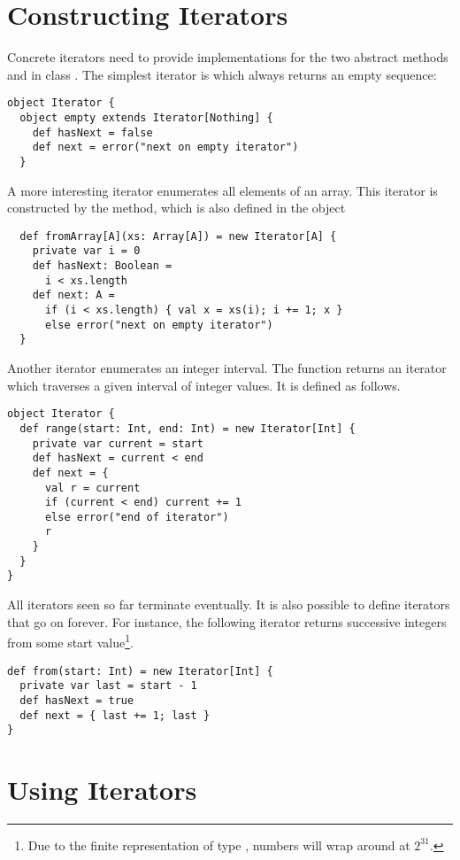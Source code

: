 {\section{Constructing Iterators}

Concrete iterators need to provide implementations for the two
abstract methods  and  in class
. The simplest iterator is  which
always returns an empty sequence:
\begin{lstlisting}
object Iterator {
  object empty extends Iterator[Nothing] {
    def hasNext = false
    def next = error("next on empty iterator")
  }
\end{lstlisting}
A more interesting iterator enumerates all elements of an array. This
iterator is constructed by the  method, which is also defined in the object 
\begin{lstlisting}
  def fromArray[A](xs: Array[A]) = new Iterator[A] {
    private var i = 0
    def hasNext: Boolean =
      i < xs.length
    def next: A =
      if (i < xs.length) { val x = xs(i); i += 1; x }
      else error("next on empty iterator")
  }
\end{lstlisting}
Another iterator enumerates an integer interval.  The
 function returns an iterator which traverses a
given interval of integer values. It is defined as follows.
\begin{lstlisting}
object Iterator {
  def range(start: Int, end: Int) = new Iterator[Int] {
    private var current = start
    def hasNext = current < end
    def next = {
      val r = current
      if (current < end) current += 1
      else error("end of iterator")
      r
    }
  }
}
\end{lstlisting}
All iterators seen so far terminate eventually. It is also possible to
define iterators that go on forever. For instance, the following
iterator returns successive integers from some start
value\footnote{Due to the finite representation of type ,
numbers will wrap around at $2^{31}$.}.
\begin{lstlisting}
def from(start: Int) = new Iterator[Int] {
  private var last = start - 1
  def hasNext = true
  def next = { last += 1; last }
}
\end{lstlisting}

\section{Using Iterators}

}
